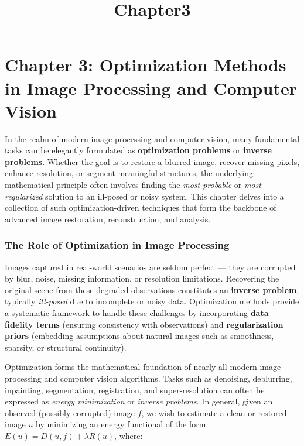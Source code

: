 \documentclass[11pt]{article}
\title{Chapter3}
\begin{document}
    
    \maketitle
    
    

    
    \hypertarget{chapter-3-optimization-methods-in-image-processing-and-computer-vision}{%
\section{\texorpdfstring{\textbf{Chapter 3: Optimization Methods in
Image Processing and Computer
Vision}}{Chapter 3: Optimization Methods in Image Processing and Computer Vision}}\label{chapter-3-optimization-methods-in-image-processing-and-computer-vision}}

    In the realm of modern image processing and computer vision, many
fundamental tasks can be elegantly formulated as \textbf{optimization
problems} or \textbf{inverse problems}. Whether the goal is to restore a
blurred image, recover missing pixels, enhance resolution, or segment
meaningful structures, the underlying mathematical principle often
involves finding the \emph{most probable} or \emph{most regularized}
solution to an ill-posed or noisy system. This chapter delves into a
collection of such optimization-driven techniques that form the backbone
of advanced image restoration, reconstruction, and analysis.

\hypertarget{the-role-of-optimization-in-image-processing}{%
\subsubsection{\texorpdfstring{\textbf{The Role of Optimization in Image
Processing}}{The Role of Optimization in Image Processing}}\label{the-role-of-optimization-in-image-processing}}

Images captured in real-world scenarios are seldom perfect --- they are
corrupted by blur, noise, missing information, or resolution
limitations. Recovering the original scene from these degraded
observations constitutes an \textbf{inverse problem}, typically
\emph{ill-posed} due to incomplete or noisy data. Optimization methods
provide a systematic framework to handle these challenges by
incorporating \textbf{data fidelity terms} (ensuring consistency with
observations) and \textbf{regularization priors} (embedding assumptions
about natural images such as smoothness, sparsity, or structural
continuity).

Optimization forms the mathematical foundation of nearly all modern
image processing and computer vision algorithms. Tasks such as
denoising, deblurring, inpainting, segmentation, registration, and
super-resolution can often be expressed as \emph{energy minimization} or
\emph{inverse problems}. In general, given an observed (possibly
corrupted) image \(f\), we wish to estimate a clean or restored image
\(u\) by minimizing an energy functional of the form
\(E(u) = D(u, f) + \lambda R(u)\), where:
\end{document}
